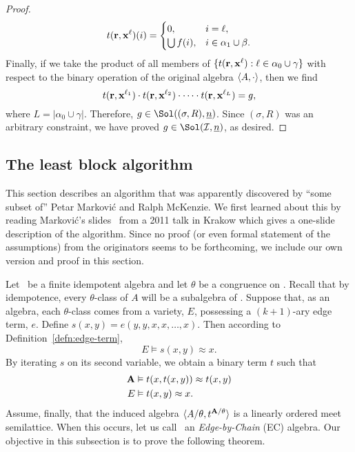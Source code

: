\begin{example}
\begin{proof}
  \[
  t(\mathbf{r}, \mathbf{x}^\ell)(i) = 
  \begin{cases}
    0, & i = \ell,\\
    \bigcup f(i), & i\in \alpha_1 \cup \beta.
  \end{cases}
  \]
  Finally, if we take the product of all members of
  $\{t(\mathbf{r}, \mathbf{x}^\ell) : \ell \in \alpha_0 \cup \gamma\}$
  with respect to the binary operation of the original algebra $\langle A, \cdot\rangle$,
  then we find
  \[
  t(\mathbf{r}, \mathbf{x}^{\ell_1}) \cdot t(\mathbf{r}, \mathbf{x}^{\ell_2}) \cdot \cdots \cdot t(\mathbf{r}, \mathbf{x}^{\ell_{L}}) = g,
  \]
  where $L = |\alpha_0\cup \gamma|$.
  Therefore, $g \in \Sol((\sigma, R), \nn)$. Since $(\sigma, R)$ was an arbitrary constraint,
  we have proved $g \in \Sol(\sI, \nn)$, as desired.
\end{proof}
\end{example}

\subsection{The least block algorithm}
This section describes an algorithm that was apparently discovered by
``some subset of'' Petar Markovi\'c and Ralph McKenzie.  We first learned about
this by reading Markovi\'c's slides~\cite{Markovic:2011}
from a 2011 talk in Krakow which gives a one-slide description of
the algorithm. Since no proof (or even formal statement of the assumptions) from the 
originators seems to be forthcoming, we include our own version and proof in this section. 

Let \bA\ be a finite idempotent algebra and let $\theta$ be a congruence on \bA. Recall that by 
idempotence, every $\theta$-class of $A$ will be a subalgebra of \bA. Suppose that, as an 
algebra, each $\theta$-class comes from a variety, $E$, possessing a $(k+1)$-ary edge term, 
$e$. Define $s(x,y)= e(y,y,x,x,\dots,x)$. Then according to Definition~\ref{defn:edge-term}, 
\begin{equation*}
E \vDash s(x,y) \approx x.
\end{equation*}
By iterating $s$ on its second variable, we obtain a binary term $t$ such that
\begin{align}
\bA &\vDash t(x,t(x,y)) \approx t(x,y)\label{eqn:ILT} \\
E &\vDash t(x,y) \approx x. \label{eqn:Lz}
\end{align}
Assume, finally, that the induced algebra $\langle A/\theta, t^{\mathbf{A}/\theta}\rangle$ is a linearly ordered 
meet semilattice. When this occurs, let us call \bA\ an \emph{Edge-by-Chain} (EC) algebra. 
Our objective in this subsection is to prove the following theorem.

